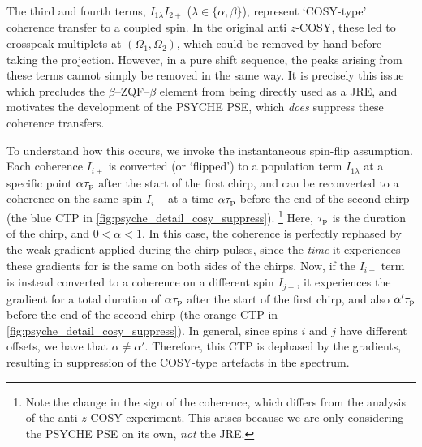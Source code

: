 The third and fourth terms, $I_{1\lambda}I_{2+}$ ($\lambda \in \{\alpha,\beta\}$), represent `COSY-type' coherence transfer to a coupled spin.
In the original anti $z$-COSY, these led to crosspeak multiplets at $(\Omega_1, \Omega_2)$, which could be removed by hand before taking the projection.
However, in a pure shift sequence, the peaks arising from these terms cannot simply be removed in the same way.
It is precisely this issue which precludes the $\beta$--ZQF--$\beta$ element from being directly used as a JRE, and motivates the development of the PSYCHE PSE, which \textit{does} suppress these coherence transfers.

To understand how this occurs, we invoke the instantaneous spin-flip assumption.
Each coherence $I_{i+}$ is converted (or `flipped') to a population term $I_{1\lambda}$ at a specific point $\alpha\tau_\mathrm{p}$ after the start of the first chirp, and can be reconverted to a coherence on the same spin $I_{i-}$ at a time $\alpha\tau_\mathrm{p}$ before the end of the second chirp (the blue CTP in \cref{fig:psyche_detail_cosy_suppress}).%
\footnote{Note the change in the sign of the coherence, which differs from the analysis of the anti $z$-COSY experiment. This arises because we are only considering the PSYCHE PSE on its own, \textit{not} the JRE.}
Here, $\tau_\mathrm{p}$ is the duration of the chirp, and $0 < \alpha < 1$.
In this case, the coherence is perfectly rephased by the weak gradient applied during the chirp pulses, since the \textit{time} it experiences these gradients for is the same on both sides of the chirps.
Now, if the $I_{i+}$ term is instead converted to a coherence on a different spin $I_{j-}$, it experiences the gradient for a total duration of $\alpha\tau_\mathrm{p}$ after the start of the first chirp, and also $\alpha'\tau_\mathrm{p}$ before the end of the second chirp (the orange CTP in \cref{fig:psyche_detail_cosy_suppress}).
In general, since spins $i$ and $j$ have different offsets, we have that $\alpha \neq \alpha'$.
Therefore, this CTP is dephased by the gradients, resulting in suppression of the COSY-type artefacts in the spectrum.

